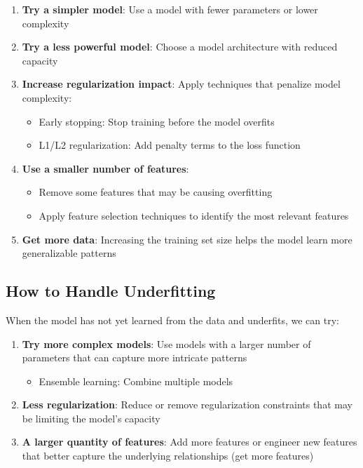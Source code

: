 \documentclass[11pt,a4paper]{article}
\theoremstyle{definition}
\theoremstyle{plain}
\theoremstyle{remark}
\begin{document}
\begin{enumerate}
    \item \textbf{Try a simpler model}: Use a model with fewer parameters or lower complexity
    
    \item \textbf{Try a less powerful model}: Choose a model architecture with reduced capacity
    
    \item \textbf{Increase regularization impact}: Apply techniques that penalize model complexity:
    \begin{itemize}
        \item Early stopping: Stop training before the model overfits
        \item L1/L2 regularization: Add penalty terms to the loss function
    \end{itemize}
    
    \item \textbf{Use a smaller number of features}:
    \begin{itemize}
        \item Remove some features that may be causing overfitting
        \item Apply feature selection techniques to identify the most relevant features
    \end{itemize}
    
    \item \textbf{Get more data}: Increasing the training set size helps the model learn more generalizable patterns
\end{enumerate}

\subsection{How to Handle Underfitting}

When the model has not yet learned from the data and underfits, we can try:

\begin{enumerate}
    \item \textbf{Try more complex models}: Use models with a larger number of parameters that can capture more intricate patterns
    \begin{itemize}
        \item Ensemble learning: Combine multiple models
    \end{itemize}
    
    \item \textbf{Less regularization}: Reduce or remove regularization constraints that may be limiting the model's capacity
    
    \item \textbf{A larger quantity of features}: Add more features or engineer new features that better capture the underlying relationships (get more features)
\end{enumerate}
\end{document}
